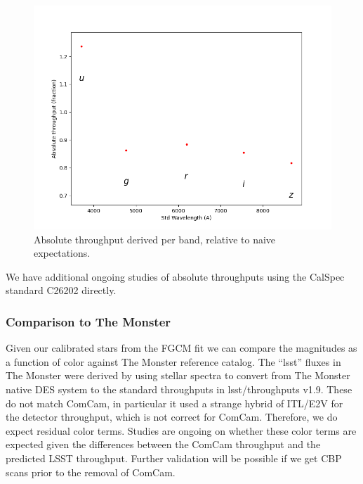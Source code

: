 \begin{figure}
  \label{fig:absthroughputs}
  \includegraphics{photometric_calibration_figures/abs_throughput.png}
  \caption{Absolute throughput derived per band, relative to naive
    expectations.}
\end{figure}

We have additional ongoing studies of absolute throughputs using the CalSpec
standard C26202 directly.

\subsubsection{Comparison to The Monster}

Given our calibrated stars from the FGCM fit we can compare the magnitudes as a
function of color against The Monster reference catalog.  The ``lsst'' fluxes
in The Monster were derived by using stellar spectra to convert from The
Monster native DES system to the standard throughputs in lsst/throughputs
v1.9. These do not match ComCam, in particular it used a strange hybrid of
ITL/E2V for the detector throughput, which is not correct for
ComCam. Therefore, we do expect residual color terms.  Studies are ongoing on
whether these color terms are expected given the differences between the ComCam
throughput and the predicted LSST throughput.  Further validation will be
possible if we get CBP scans prior to the removal of ComCam.

